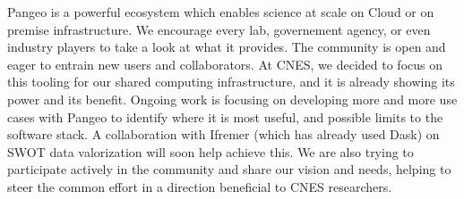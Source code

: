 \documentclass{article}
\begin{document}
Pangeo is a powerful ecosystem which enables science at scale on Cloud or on premise infrastructure. We encourage every lab, governement agency, or even industry players to take a look at what it provides. The community is open and eager to entrain new users and collaborators.
At CNES, we decided to focus on this tooling for our shared computing infrastructure, and it is already showing its power and its benefit. Ongoing work is focusing on developing more and more use cases with Pangeo to identify where it is most useful, and possible limits to the software stack. A collaboration with Ifremer (which has already used Dask\cite{b9}) on SWOT data valorization will soon help achieve this. We are also trying to participate  actively in the community and share our vision and needs, helping to steer the common effort in a direction beneficial to CNES researchers.







\small
\end{document}
